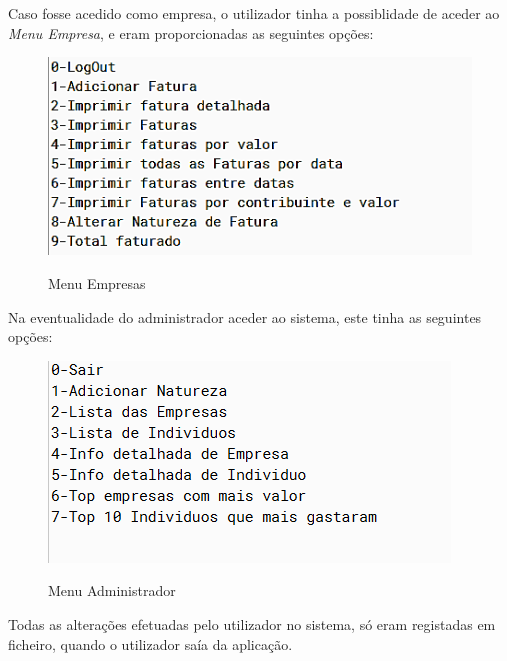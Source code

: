 \documentclass[10pt, a4paper]{report}
\begin{document}
Caso fosse acedido como empresa, o utilizador tinha a possiblidade de aceder ao \emph{Menu Empresa}, e eram proporcionadas as seguintes opções:

\begin{figure}[h]
\caption{Menu Empresas}
\centering
\includegraphics{Empresas}
\label{menu2}
\end{figure}

Na eventualidade do administrador aceder ao sistema, este tinha as seguintes opções:

\begin{figure}[h]
\caption{Menu Administrador}
\centering
\includegraphics{Admin}
\label{menu3}
\end{figure}

Todas as alterações efetuadas pelo utilizador no sistema, só eram registadas em ficheiro, quando o utilizador saía da aplicação.
\end{document}
